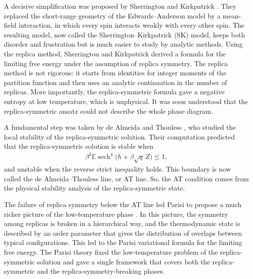 \documentclass[11pt]{article}
\numberwithin{equation}{section}
\newcommand{\1}{\mathbf 1}
\begin{document}
A decisive simplification was proposed by Sherrington and Kirkpatrick \cite{SherringtonKirkpatrick1975}. They replaced the short-range geometry of the Edwards--Anderson model by a mean-field interaction, in which every spin interacts weakly with every other spin. The resulting model, now called the Sherrington--Kirkpatrick (SK) model, keeps both disorder and frustration but is much easier to study by analytic methods. Using the replica method, Sherrington and Kirkpatrick derived a formula for the limiting free energy under the assumption of replica symmetry. The replica method is not rigorous: it starts from identities for integer moments of the partition function and then uses an analytic continuation in the number of replicas. More importantly, the replica-symmetric formula gave a negative entropy at low temperature, which is unphysical. It was soon understood that the replica-symmetric ansatz could not describe the whole phase diagram.

A fundamental step was taken by de Almeida and Thouless \cite{deAlmeidaThouless1978}, who studied the local stability of the replica-symmetric solution. 
Their computation predicted that the replica-symmetric solution is  stable when
\begin{align}
    \label{eq: AT region}
\beta^2\mathbb E\operatorname{sech}^4\bigl(h+\beta\sqrt q\,Z\bigr)\leq 1,
\end{align}
and unstable when the reverse strict inequality holds. This boundary is now called the de Almeida--Thouless line, or AT line. So, the AT condition comes from the physical stability analysis of the replica-symmetric state.

The failure of replica symmetry below the AT line led Parisi to propose a much richer picture of the low-temperature phase \cite{Parisi1979,Parisi1980}. In this picture, the symmetry among replicas is broken in a hierarchical way, and the thermodynamic state is described by an order parameter that gives the distribution of overlaps between typical configurations. This led to the Parisi variational formula for the limiting free energy. The Parisi theory fixed the low-temperature problem of the replica-symmetric solution and gave a single framework that covers both the replica-symmetric and the replica-symmetry-breaking phases.
\end{document}
